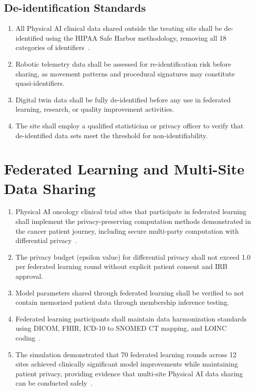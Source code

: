 \subsection{De-identification Standards}

\begin{enumerate}[label=(\alph*)]
\item All Physical AI clinical data shared outside the treating site shall be
  de-identified using the HIPAA Safe Harbor methodology, removing all 18
  categories of identifiers~\cite{cfr50adapt}.

\item Robotic telemetry data shall be assessed for re-identification risk
  before sharing, as movement patterns and procedural signatures may
  constitute quasi-identifiers.

\item Digital twin data shall be fully de-identified before any use in
  federated learning, research, or quality improvement activities.

\item The site shall employ a qualified statistician or privacy officer to
  verify that de-identified data sets meet the threshold for non-identifiability.
\end{enumerate}

\section{Federated Learning and Multi-Site\\Data Sharing}

\begin{enumerate}[label=(\alph*)]
\item Physical AI oncology clinical trial sites that participate in federated
  learning shall implement the privacy-preserving computation methods
  demonstrated in the cancer patient journey, including secure multi-party
  computation with differential privacy~\cite{patientjourney2026}.

\item The privacy budget (epsilon value) for differential privacy shall not
  exceed 1.0 per federated learning round without explicit patient consent and
  IRB approval.

\item Model parameters shared through federated learning shall be verified to
  not contain memorized patient data through membership inference testing.

\item Federated learning participants shall maintain data harmonization
  standards using DICOM, FHIR, ICD-10 to SNOMED CT mapping, and LOINC
  coding~\cite{iche6r3adapt}.

\item The simulation demonstrated that 70 federated learning rounds across 12
  sites achieved clinically significant model improvements while maintaining
  patient privacy, providing evidence that multi-site Physical AI data sharing
  can be conducted safely~\cite{patientjourney2026}.
\end{enumerate}

